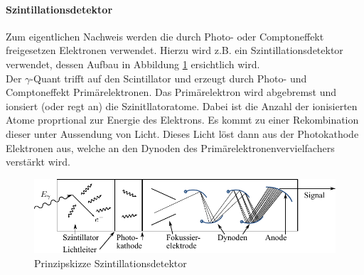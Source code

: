 \documentclass[a4paper,twoside,final]{article}
\begin{document}
\paragraph{Szintillationsdetektor}
Zum eigentlichen Nachweis werden die durch Photo- oder Comptoneffekt freigesetzen Elektronen verwendet. Hierzu wird z.B. ein Szintillationsdetektor verwendet, dessen Aufbau in Abbildung \ref{fig:Szintillationsdetektor} ersichtlich wird.\\
Der $\gamma$-Quant trifft auf den Scintillator und erzeugt durch Photo- und Comptoneffekt Primärelektronen. Das Primärelektron wird abgebremst und ionsiert (oder regt an) die Szinitllatoratome. Dabei ist die Anzahl der ionisierten Atome proprtional zur Energie des Elektrons. Es kommt zu einer Rekombination dieser unter Aussendung von Licht. Dieses Licht löst dann aus der Photokathode Elektronen aus, welche an den Dynoden des Primärelektronenvervielfachers verstärkt wird.

\begin{figure}[htp]
    \centering
    \includegraphics{Bilder/Szintillationsdetektor.pdf}
    \caption{Prinzipskizze Szintillationsdetektor}
    \label{fig:Szintillationsdetektor}
\end{figure}
\end{document}
